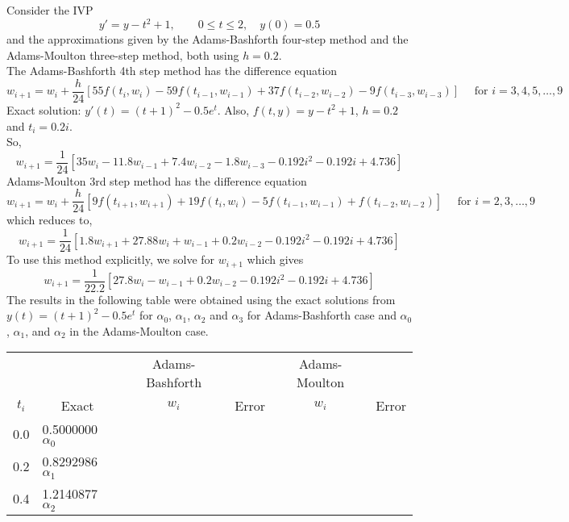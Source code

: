 \documentclass[../main-sheet.tex]{subfiles}
\begin{document}
\begin{ex}
    Consider the IVP
    \[y'=y-t^2+1,\qquad 0\leq t\leq 2, \quad y(0)=0.5\]
    and the approximations given by the Adams-Bashforth four-step method and the Adams-Moulton three-step method, both using \(h=0.2\).\\
    The Adams-Bashforth 4th step method has the difference equation
    \[
        w_{i+1}=w_i+\frac{h}{24}\left[ 55f(t_i,w_i)-59f(t_{i-1},w_{i-1})+37f(t_{i-2},w_{i-2})-9f(t_{i-3},w_{i-3}) \right]\quad\text{ for } i=3,4,5,\dots, 9
    \]
    Exact solution: \(y'(t)=(t+1)^2-0.5e^t\). Also, \(f(t,y)=y-t^2+1\), \(h=0.2\) and \(t_i=0.2i\).\\
    So,
    \[
        w_{i+1}=\frac{1}{24}\left[ 35w_i-11.8w_{i-1}+7.4w_{i-2}-1.8w_{i-3}-0.192i^2-0.192i+4.736 \right]
    \]
    Adams-Moulton 3rd step method has the difference equation
    \[
        w_{i+1}=w_i+\frac{h}{24}\left[ 9f(t_{i+1},w_{i+1})+19f(t_{i},w_{i})-5f(t_{i-1},w_{i-1})+f(t_{i-2},w_{i-2}) \right]\quad\text{ for } i=2,3,\dots,9
        \]
    which reduces to,
    \[
        w_{i+1}=\frac{1}{24}\left[ 1.8w_{i+1}+27.88w_{i}+w_{i-1}+0.2w_{i-2}-0.192i^2-0.192i+4.736 \right]
    \]
    To use this method explicitly, we solve for \(w_{i+1}\) which gives
    \[
        w_{i+1}=\frac{1}{22.2}\left[ 27.8w_{i}-w_{i-1}+0.2w_{i-2}-0.192i^2-0.192i+4.736 \right]
    \]
    The results in the following table were obtained using the exact solutions from \(y(t)=(t+1)^2-0.5e^t\) for \(\alpha_0\), \(\alpha_1\), \(\alpha_2\) and \(\alpha_3\) for Adams-Bashforth case and \(\alpha_0\), \(\alpha_1\), and \(\alpha_2\) in the Adams-Moulton case.
    \begin{table}[H]
        \centering
        \begin{tabular}{clcccc}
        \toprule
             &            & Adams- Bashforth &             & Adams-Moulton&           \\ 
        \(t_i\)   &\multicolumn{1}{c}{Exact}& \(w_i\)             & Error       & \(w_i\)                                                            & Error     \\\midrule
        0.0  & 0.5000000 \(\alpha_0\)  &                  &             &                                                               &           \\
        0.2  & 0.8292986 \(\alpha_1\)  &                  &             &                                                               &           \\
        0.4  & 1.2140877 \(\alpha_2\)  &                  &             &                                                               &           \\

\end{tabular}
\end{table}
\end{ex}
\end{document}
